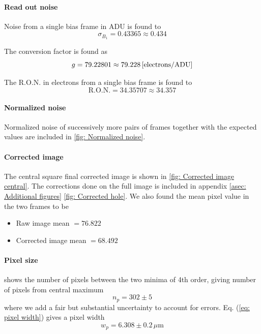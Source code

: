 \documentclass{emulateapj}
\begin{document}
\paragraph{Read out noise}
Noise from a single bias frame in ADU is found to
\begin{equation}
	\sigma_{B_1} = 0.43365 \approx 0.434
\end{equation}

The conversion factor is found as
\begin{equation}
	g = 79.22801 \approx 79.228\, \qty[\text{electrons/ADU}]
\end{equation}

The R.O.N. in electrons from a single bias frame is found to
\begin{equation}
	\text{R.O.N.}  = 34.35707 \approx 34.357
\end{equation}

\paragraph{Normalized noise}
Normalized noise of successively more pairs of frames together with the expected values are included in \cref{fig: Normalized noise}.

\paragraph{Corrected image}
The central square final corrected image is shown in \cref{fig: Corrected image central}. The corrections done on the full image is included in appendix \ref{asec: Additional figures} \cref{fig: Corrected hole}. We also found the mean pixel value in the two frames to be
\begin{itemize}
	\item Raw image mean $=76.822$
	\item Corrected image mean $=68.492$ 
\end{itemize}

\paragraph{Pixel size}
 shows the number of pixels between the two minima of 4th order, giving number of pixels from central maximum
\begin{equation}
	n_p = 302 \pm 5
	\label{eq: Amount of pixels}
\end{equation}
where we add a fair but substantial uncertainty to account for errors. Eq. (\ref{eq: pixel width}) gives a pixel width
\begin{equation}
	w_p = 6.308 \pm 0.2 \, \mu\text{m}
\end{equation}
\end{document}
